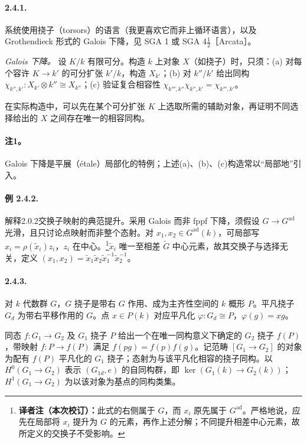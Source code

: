 \paragraph*{2.4.1.} 系统使用挠子（torsors）的语言（我更喜欢它而非上循环语言），以及 Grothendieck 形式的 Galois 下降，见 SGA 1 或 SGA $4\frac12$［Arcata］。

\emph{Galois 下降。} 设 $K/k$ 有限可分。构造 $k$ 上对象 $X$（如挠子）时，只须：(a) 对每个容许 $K\to k'$ 的可分扩张 $k'/k$，构造 $X_{k'}$；(b) 对 $k''/k'$ 给出同构 $\chi_{k'',k'}:X_{k'}\otimes k''\cong X_{k''}$；(c) 验证复合相容性 $\chi_{k''',k''}\chi_{k'',k'}=\chi_{k''',k'}$。

在实际构造中，可以先在某个可分扩张 $K$ 上选取所需的辅助对象，再证明不同选择给出的 $X$ 之间存在唯一的相容同构。

\paragraph*{注1。} Galois 下降是平展（étale）局部化的特例；上述(a)、(b)、(c)构造常以“局部地”引入。
\paragraph*{例 2.4.2.} 解释2.0.2交换子映射的典范提升。采用 Galois 而非 fppf 下降，须假设 $G\to G^{\mathrm{ad}}$ 光滑，且只讨论点映射而非整个态射。对 $x_1,x_2\in G^{\mathrm{ad}}(k)$，可局部写 $x_i=\rho(\widetilde x_i)z_i$，$z_i$ 在中心。\footnote{\textbf{译者注（本次校订）：}此式的右侧属于 $G$，而 $x_i$ 原先属于 $G^{\mathrm{ad}}$。严格地说，应先在局部将 $x_i$ 提升为 $G$ 的元素，再作上述分解；不同提升相差中心元素，故所定义的交换子不受影响。}$\widetilde x_i$ 唯一至相差 $\widetilde G$ 中心元素，故其交换子与选择无关，定义 $(x_1,x_2)=\widetilde x_1\widetilde x_2\widetilde x_1^{-1}\widetilde x_2^{-1}$。
\paragraph*{2.4.3.} 对 $k$ 代数群 $G$，$G$ 挠子是带右 $G$ 作用、成为主齐性空间的 $k$ 概形 $P$。平凡挠子 $G_d$ 为带右平移作用的 $G$。点 $x\in P(k)$ 对应平凡化 $\varphi:G_d\cong P$，$\varphi(g)=xg$。

同态 $f:G_1\to G_2$ 及 $G_1$ 挠子 $P$ 给出一个在唯一同构意义下确定的 $G_2$ 挠子 $f(P)$，带映射 $f:P\to f(P)$ 满足 $f(pg)=f(p)f(g)$。记范畴 $[G_1\to G_2]$ 的对象为配有 $f(P)$ 平凡化的 $G_1$ 挠子；态射为与该平凡化相容的挠子同构。以 $H^0(G_1\to G_2)$ 表示 $(G_{1d},e)$ 的自同构群，即 $\ker(G_1(k)\to G_2(k))$；$H^1(G_1\to G_2)$ 为以该对象为基点的同构类集。

